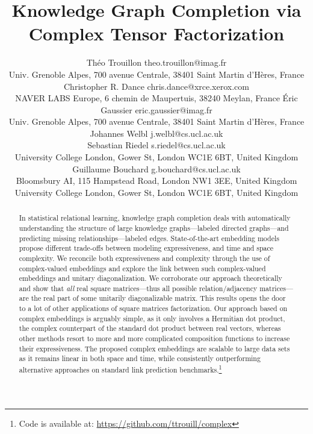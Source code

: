 \documentclass[twoside,11pt]{article}
\begin{document}
\title{Knowledge Graph Completion via Complex Tensor Factorization}

\author{\name Th\'eo Trouillon \email theo.trouillon@imag.fr \\
       \addr Univ. Grenoble Alpes, 700 avenue Centrale, 38401 Saint Martin d'H\`eres, France
       \AND
       \name Christopher R. Dance \email chris.dance@xrce.xerox.com \\
       \addr NAVER LABS Europe, 6 chemin de Maupertuis, 38240 Meylan, France
       \AND
       \name \'Eric Gaussier \email eric.gaussier@imag.fr \\
       \addr Univ. Grenoble Alpes, 700 avenue Centrale, 38401 Saint Martin d'H\`eres, France
       \AND
       \name Johannes Welbl \email j.welbl@cs.ucl.ac.uk \\
\name Sebastian Riedel \email s.riedel@cs.ucl.ac.uk \\
       \addr University College London, Gower St, London WC1E 6BT, United Kingdom 
       \AND
       \name Guillaume Bouchard \email g.bouchard@cs.ucl.ac.uk \\
       \addr Bloomsbury AI, 115 Hampstead Road, London NW1 3EE, United Kingdom \\
       \addr University College London, Gower St, London WC1E 6BT, United Kingdom
       }



\maketitle

\begin{abstract}


In statistical relational learning, knowledge graph completion deals with automatically understanding the structure of large knowledge graphs---labeled directed graphs---and predicting missing relationships---labeled edges. State-of-the-art embedding models propose different trade-offs between modeling expressiveness, and time and space complexity. We reconcile both expressiveness and complexity through the use of complex-valued embeddings and explore the link between such complex-valued embeddings and unitary diagonalization. We corroborate our approach theoretically and show that \emph{all} real square matrices---thus all possible relation/adjacency matrices---are the real part of some unitarily diagonalizable matrix. This results opens the door to a lot of other applications of square matrices factorization. Our approach based on complex embeddings is arguably simple, as it only involves a Hermitian dot product, the complex counterpart of the standard dot product between real vectors, whereas other methods resort to more and more complicated composition functions to increase their expressiveness. The proposed complex embeddings are scalable to large data sets as it remains linear in both space and time, while consistently outperforming alternative approaches on standard link prediction benchmarks.\footnote{Code is available at: \url{https://github.com/ttrouill/complex}}
\end{abstract}
\end{document}
